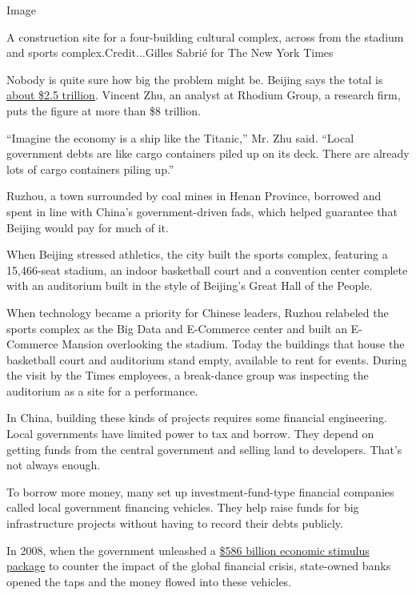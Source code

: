 Image

A construction site for a four-building cultural complex, across from
the stadium and sports complex.Credit...Gilles Sabrié for The New York
Times

Nobody is quite sure how big the problem might be. Beijing says the
total is
\href{http://yss.mof.gov.cn/zhuantilanmu/dfzgl/sjtj/201904/t20190403_3211696.html}{about
\$2.5 trillion}. Vincent Zhu, an analyst at Rhodium Group, a research
firm, puts the figure at more than \$8 trillion.

``Imagine the economy is a ship like the Titanic,'' Mr. Zhu said.
``Local government debts are like cargo containers piled up on its deck.
There are already lots of cargo containers piling up.''

Ruzhou, a town surrounded by coal mines in Henan Province, borrowed and
spent in line with China's government-driven fads, which helped
guarantee that Beijing would pay for much of it.

When Beijing stressed athletics, the city built the sports complex,
featuring a 15,466-seat stadium, an indoor basketball court and a
convention center complete with an auditorium built in the style of
Beijing's Great Hall of the People.

When technology became a priority for Chinese leaders, Ruzhou relabeled
the sports complex as the Big Data and E-Commerce center and built an
E-Commerce Mansion overlooking the stadium. Today the buildings that
house the basketball court and auditorium stand empty, available to rent
for events. During the visit by the Times employees, a break-dance group
was inspecting the auditorium as a site for a performance.

In China, building these kinds of projects requires some financial
engineering. Local governments have limited power to tax and borrow.
They depend on getting funds from the central government and selling
land to developers. That's not always enough.

To borrow more money, many set up investment-fund-type financial
companies called local government financing vehicles. They help raise
funds for big infrastructure projects without having to record their
debts publicly.

In 2008, when the government unleashed a
\href{https://www.nytimes3xbfgragh.onion/2008/11/10/world/asia/10china.html}{\$586
billion economic stimulus package} to counter the impact of the global
financial crisis, state-owned banks opened the taps and the money flowed
into these vehicles.

